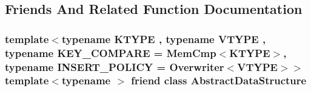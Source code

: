 \subsection{Friends And Related Function Documentation}
\hypertarget{classshad_1_1Hashmap_ab18afa4496cc863ddc11bab94b2adf57}{
\subsubsection[{Abstract\-Data\-Structure}]{\setlength{\rightskip}{0pt plus 5cm}template$<$typename K\-T\-Y\-P\-E , typename V\-T\-Y\-P\-E , typename K\-E\-Y\-\_\-\-C\-O\-M\-P\-A\-R\-E  = Mem\-Cmp$<$\-K\-T\-Y\-P\-E$>$, typename I\-N\-S\-E\-R\-T\-\_\-\-P\-O\-L\-I\-C\-Y  = Overwriter$<$\-V\-T\-Y\-P\-E$>$$>$ template$<$typename $>$ friend class {\bf Abstract\-Data\-Structure}\hspace{0.3cm}{\ttfamily [friend]}}}\label{classshad_1_1Hashmap_ab18afa4496cc863ddc11bab94b2adf57}
